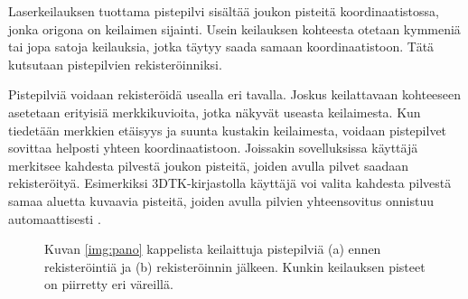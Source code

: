 Laserkeilauksen tuottama pistepilvi sisältää joukon pisteitä koordinaatistossa, jonka origona on keilaimen sijainti. Usein keilauksen kohteesta otetaan kymmeniä tai jopa satoja keilauksia, jotka täytyy saada samaan koordinaatistoon. Tätä kutsutaan pistepilvien rekisteröinniksi. 

Pistepilviä voidaan rekisteröidä usealla eri tavalla. Joskus keilattavaan kohteeseen asetetaan erityisiä merkkikuvioita, jotka näkyvät useasta keilaimesta. Kun tiedetään merkkien etäisyys ja suunta kustakin keilaimesta, voidaan pistepilvet sovittaa helposti yhteen koordinaatistoon. Joissakin sovelluksissa käyttäjä merkitsee kahdesta pilvestä joukon pisteitä, joiden avulla pilvet saadaan rekisteröityä. Esimerkiksi 3DTK-kirjastolla käyttäjä voi valita kahdesta pilvestä samaa aluetta kuvaavia pisteitä, joiden avulla pilvien yhteensovitus onnistuu automaattisesti \cite{3dtk}.  

\begin{figure}
    \centering
    
    \caption{Kuvan \ref{img:pano} kappelista keilaittuja pistepilviä (a) ennen rekisteröintiä ja (b) rekisteröinnin jälkeen. Kunkin keilauksen pisteet on piirretty eri väreillä.}
    \label{img:reg}
\end{figure}

